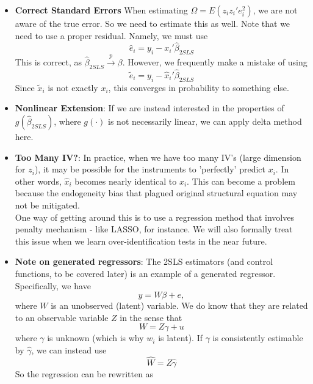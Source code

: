 \documentclass[12pt]{article}
\theoremstyle{definition}
\theoremstyle{property}
\theoremstyle{assumption}
\theoremstyle{example}
\theoremstyle{comment}
\newtheorem{comment}{Comment}[section]
\begin{document}
\begin{itemize}
\item \textbf{Correct Standard Errors} When estimating $\Omega=E(z_iz_i'e_i^2)$, we are not aware of the true error. So we need to estimate this as well. Note that we need to use a proper residual. Namely, we must use
\[
\hat{e}_i = y_i - x_i'\hat{\beta}_{2SLS}
\]
This is correct, as $\hat{\beta}_{2SLS}\xrightarrow{p}\beta$. However, we frequently make a mistake of using
\[
\tilde{e}_i = y_i - \hat{x}_i'\hat{\beta}_{2SLS}
\]
Since $\tilde{x}_i$ is not exactly $x_i$, this converges in probability to something else. 
\begin{mdframed}[backgroundcolor=yellow!5] 
\begin{comment}[on STATA]
To see this, compare the standard errors from doing \textnormal{\texttt{ivregress 2sls y (x=z)}} and 'hard-coding' 2SLS by using \textnormal{\texttt{reg x z}}, then \textnormal{\texttt{predict xhat}}, and then coding \textnormal{\texttt{reg y xhat}}. 
\end{comment}
\end{mdframed}
\item \textbf{Nonlinear Extension}: If we are instead interested in the properties of $g(\hat{\beta}_{2SLS})$, where $g(\cdot)$ is not necessarily linear, we can apply delta method here. 
\item \textbf{Too Many IV?}: In practice, when we have too many IV's (large dimension for $z_i$), it may be possible for the instruments to 'perfectly' predict $x_i$. In other words, $\hat{x}_i$ becomes nearly identical to $x_i$. This can become a problem because the endogeneity bias that plagued original structural equation may not be mitigated. \\
One way of getting around this is to use a regression method that involves penalty mechanism - like LASSO, for instance. We will also formally treat this issue when we learn over-identification tests in the near future. 
\item \textbf{Note on generated regressors}: The 2SLS estimators (and control functions, to be covered later) is an example of a generated regressor. Specifically, we have
\[
y = W\beta+e, 
\]
where $W$ is an unobserved (latent) variable. We do know that they are related to an observable variable $Z$ in the sense that
\[
W= Z\gamma + u
\]
where $\gamma$ is unknown (which is why $w_i$ is latent). If $\gamma$ is consistently estimable by $\hat{\gamma}$, we can instead use
\[
\widehat{W} = Z\hat{\gamma} 
\]
So the regression can be rewritten as
\[
\]
\end{itemize}
\end{document}

